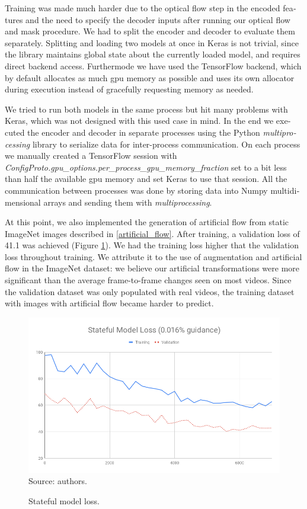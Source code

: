 \documentclass[12pt,openright,oneside,a4paper,english, brazilian]{abntex2}
\begin{document}
\begin{otherlanguage}{english}
Training was made much harder due to the optical flow step in the encoded features and the need to specify the decoder inputs after running our optical flow and mask procedure. We had to split the encoder and decoder to evaluate them separately. Splitting and loading two models at once in Keras is not trivial, since the library maintains global state about the currently loaded model, and requires direct backend access. Furthermode we have used the TensorFlow backend, which by default allocates as much \acrshort{gpu} memory as possible and uses its own allocator during execution instead of gracefully requesting memory as needed.

We tried to run both models in the same process but hit many problems with Keras, which was not designed with this used case in mind. In the end we executed the encoder and decoder in separate processes using the Python \textit{multiprocessing} library to serialize data for inter-process communication. On each process we manually created a TensorFlow session with \textit{ConfigProto.gpu\_options.per\_process\_gpu\_memory\_fraction} set to a bit less than half the available \acrshort{gpu} memory and set Keras to use that session. All the communication between processes was done by storing data into Numpy multidimensional arrays and sending them with \textit{multiprocessing}.

At this point, we also implemented the generation of artificial flow from static ImageNet images described in \ref{artificial_flow}. After training, a validation loss of 41.1 was achieved (Figure \ref{loss_stateful}). We had the training loss higher that the validation loss throughout training. We attribute it to the use of augmentation and artificial flow in the ImageNet dataset: we believe our artificial transformations were more significant than the average frame-to-frame changes seen on most videos. Since the validation dataset was only populated with real videos, the training dataset with images with artificial flow became harder to predict.

\begin{figure}[!htb]
\centering
\caption{Stateful model loss.}
\includegraphics[width=\textwidth]{loss/Stateful}
Source: authors.
\label{loss_stateful}
\end{figure}


\end{otherlanguage}
\end{document}
